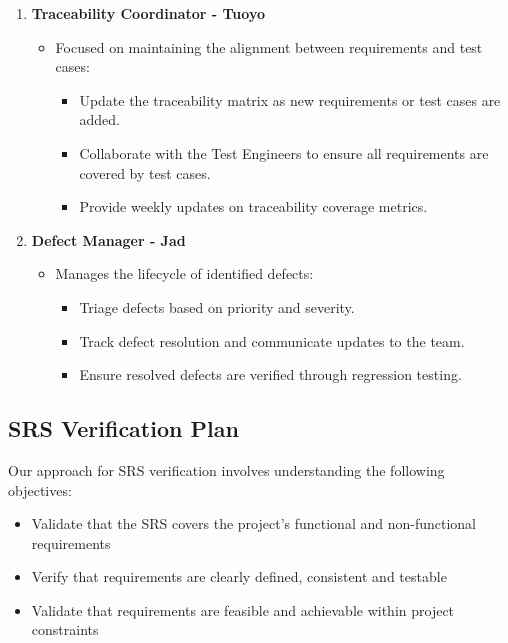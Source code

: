 \documentclass[12pt, titlepage]{article}
\begin{document}
\begin{enumerate}
    \item \textbf{Traceability Coordinator - Tuoyo}
          \begin{itemize}
              \item Focused on maintaining the alignment between requirements and test cases:
                    \begin{itemize}
                        \item Update the traceability matrix as new requirements or test cases are added.
                        \item Collaborate with the Test Engineers to ensure all requirements are covered by test cases.
                        \item Provide weekly updates on traceability coverage metrics.
                    \end{itemize}
          \end{itemize}

    \item \textbf{Defect Manager - Jad}
          \begin{itemize}
              \item Manages the lifecycle of identified defects:
                    \begin{itemize}
                        \item Triage defects based on priority and severity.
                        \item Track defect resolution and communicate updates to the team.
                        \item Ensure resolved defects are verified through regression testing.
                    \end{itemize}
          \end{itemize}
\end{enumerate}

\subsection{SRS Verification Plan}

\noindent Our approach for SRS verification involves understanding the following objectives:

\begin{itemize}
    \item Validate that the SRS covers the project's functional and non-functional requirements
    \item Verify that requirements are clearly defined, consistent and testable
    \item Validate that requirements are feasible and achievable within project constraints
\end{itemize}
\end{document}
